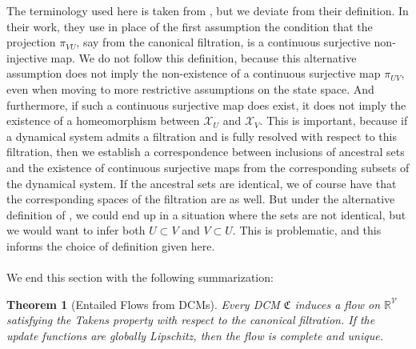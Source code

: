 \documentclass[11pt, a4paper]{memoir}
\theoremstyle{break}
\newtheorem{thm}{Theorem}
\theoremstyle{break}
\theoremstyle{nonumberplain}
\newcommand{\mR}{\mathbb{R}}
\begin{document}
The terminology used here is taken from \cite{mathFound}, but we deviate from their definition. In their work, they use in place of the first assumption the condition that the projection $\pi_{VU}$, say from the canonical filtration, is a continuous surjective non-injective map. We do not follow this definition, because this alternative assumption does not imply the non-existence of a continuous surjective map $\pi_{UV}$, even when moving to more restrictive assumptions on the state space. And furthermore, if such a continuous surjective map does exist, it does not imply the existence of a homeomorphism between $\mathcal{X}_U$ and $\mathcal{X}_V$. This is important, because if a dynamical system admits a filtration and is fully resolved with respect to this filtration, then we establish a correspondence between inclusions of ancestral sets and the existence of continuous surjective maps from the corresponding subsets of the dynamical system. If the ancestral sets are identical, we of course have that the corresponding spaces of the filtration are as well. But under the alternative definition of \cite{mathFound}, we could end up in a situation where the sets are not identical, but we would want to infer both $U\subset V$ and $V\subset U$. This is problematic, and this informs the choice of definition given here.\\\\
We end this section with the following summarization:
\begin{thm}[Entailed Flows from DCMs]
Every DCM $\mathfrak{C}$ induces a flow on $\mR^{\mathcal{V}}$ satisfying the Takens property with respect to the canonical filtration. If the update functions are globally Lipschitz, then the flow is complete and unique.
\end{thm}
\end{document}
